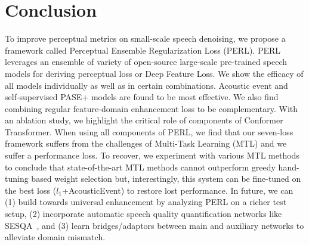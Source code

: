 \documentclass{article}
\begin{document}
\section{Conclusion}
To improve perceptual metrics on small-scale speech denoising, we propose a framework called Perceptual Ensemble Regularization Loss (PERL).
PERL leverages an ensemble of variety of open-source large-scale pre-trained speech models for deriving perceptual loss or Deep Feature Loss.
We show the efficacy of all models individually as well as in certain combinations.
Acoustic event and self-supervised PASE+ models are found to be most effective.
We also find combining regular feature-domain enhancement loss to be complementary.
With an ablation study, we highlight the critical role of components of Conformer Transformer.
When using all components of PERL, we find that our seven-loss framework suffers from the challenges of Multi-Task Learning (MTL) and we suffer a performance loss.
To recover, we experiment with various MTL methods to conclude that state-of-the-art MTL methods cannot outperform greedy hand-tuning based weight selection but, interestingly, this system can be fine-tuned on the best loss ($l_1$+AcousticEvent) to restore lost performance.
In future, we can (1) build towards universal enhancement by analyzing PERL on a richer test setup, (2) incorporate automatic speech quality quantification networks like SESQA~\cite{serra2020sesqa}, and (3) learn bridges/adaptors between main and auxiliary networks to alleviate domain mismatch.

\clearpage


\end{document}
